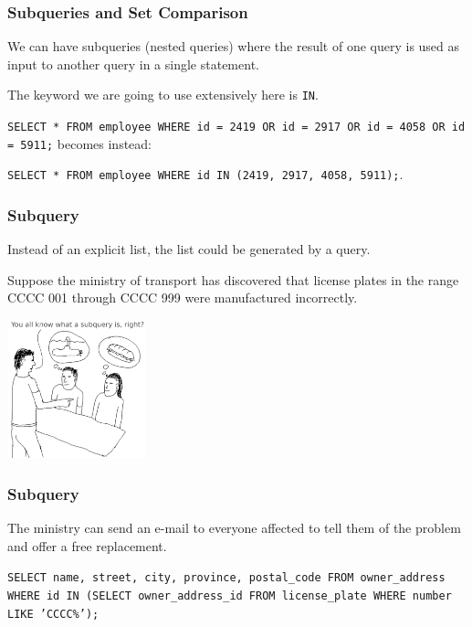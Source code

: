 \begin{frame}
\frametitle{Subqueries and Set Comparison}

We can have subqueries (nested queries) where the result of one query is used as input to another query in a single statement. 

The keyword we are going to use extensively here is \texttt{IN}.  

\texttt{SELECT * FROM employee WHERE id = 2419 OR id = 2917 OR id = 4058 OR id = 5911;} becomes instead:


\texttt{SELECT * FROM employee WHERE id IN (2419, 2917, 4058, 5911);}.

\end{frame}



\begin{frame}
\frametitle{Subquery}

Instead of an explicit list, the list could be generated by a query. 

Suppose the ministry of transport has discovered that license plates in the range CCCC 001 through CCCC 999 were manufactured incorrectly.


\begin{center}
	\includegraphics[width=0.3\textwidth]{images/subquery.png}
\end{center}


\end{frame}



\begin{frame}
\frametitle{Subquery}


The ministry can send an e-mail to everyone affected to tell them of the problem and offer a free replacement. 

\texttt{SELECT name, street, city, province, postal\_code FROM owner\_address WHERE id IN (SELECT owner\_address\_id FROM license\_plate WHERE number LIKE 'CCCC\%');}



\end{frame}



